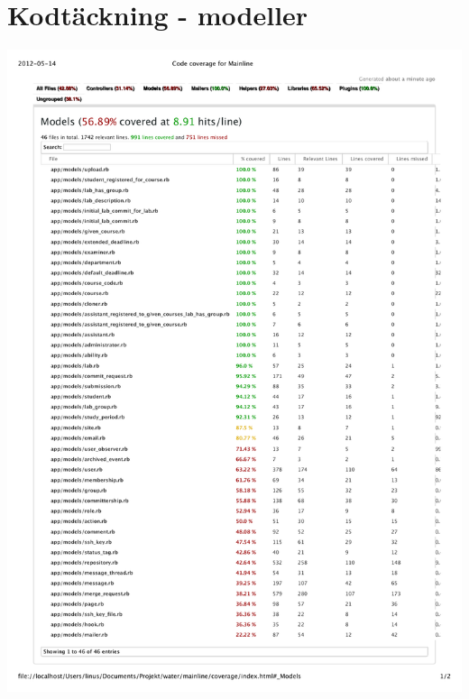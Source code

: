 \chapter{Kodtäckning - modeller}

\begin{center}
\includegraphics[width=16.5cm, ]{fig/code-coverage/code-coverage.pdf}
\end{center}
